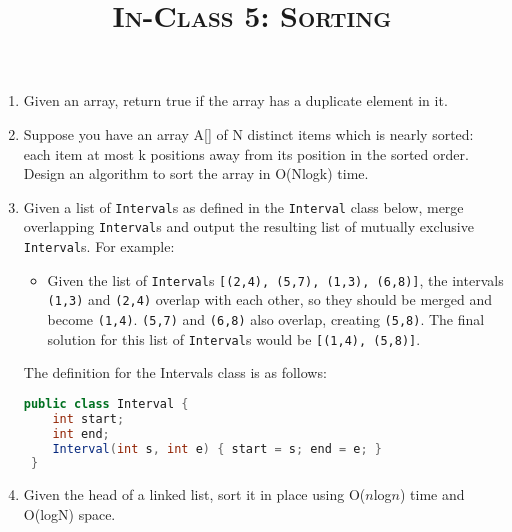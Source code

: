 \documentclass{article}
\title{\large{\textsc{In-Class 5: Sorting}}}
\date{}
\begin{document}
\maketitle

\subsection*{}

\begin{enumerate}

\item Given an array, return true if the array has a duplicate element in it.

\item Suppose you have an array A[] of N distinct items which is nearly sorted: each item at most k positions away from its position in the sorted order. Design an algorithm to sort the array in O(Nlogk) time.
	
\item Given a list of \texttt{Interval}s as defined in the \texttt{Interval} class below, merge overlapping \texttt{Interval}s and output the resulting list of mutually exclusive \texttt{Interval}s.  For example:

\begin{itemize}
    \item Given the list of \texttt{Interval}s \texttt{[(2,4), (5,7), (1,3), (6,8)]}, the  intervals \texttt{(1,3)} and \texttt{(2,4)} overlap with each other, so they should be merged and become \texttt{(1,4)}. \texttt{(5,7)} and \texttt{(6,8)} also overlap, creating \texttt{(5,8)}.  The final solution for this list of \texttt{Interval}s would be \texttt{[(1,4), (5,8)]}.
\end{itemize}

The definition for the Intervals class is as follows:

\begin{lstlisting}[language=Java]
 public class Interval {
    int start;
    int end;
    Interval(int s, int e) { start = s; end = e; }
 }
\end{lstlisting}
    
\item Given the head of a linked list, sort it in place using O($n$log$n$) time and O(logN) space.
    
\end{enumerate}

\clearpage
\end{document}
